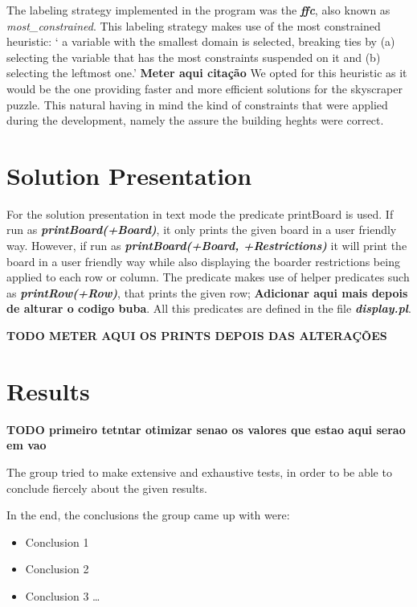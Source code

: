 \documentclass{llncs}
\begin{document}
The labeling strategy implemented in the program was the \textbf{\textit{ffc}}, also known as \textit{most\_constrained}. This labeling strategy makes use of the most constrained heuristic: ` a variable with the smallest domain is selected, breaking ties by (a) selecting the variable that has the most constraints suspended on it and (b) selecting the leftmost one.' \textbf{Meter aqui citação} We opted for this heuristic as it would be the one providing faster and more efficient solutions for the skyscraper puzzle. This natural having in mind the kind of constraints that were applied during the development, namely the assure the building heghts were correct.

%
\section{Solution Presentation}

For the solution presentation in text mode the predicate printBoard is used. If run as \textbf{\textit{printBoard(+Board)}}, it only prints the given board in a user friendly way. However, if run as \textbf{\textit{printBoard(+Board, +Restrictions)}} it will print the board in a user friendly way while also displaying the boarder restrictions being applied to each row or column. The predicate makes use of helper predicates such as \textbf{\textit{printRow(+Row)}}, that prints the given row; \textbf{Adicionar aqui mais depois de alturar o codigo buba}. All this predicates are defined in the file \textbf{\textit{display.pl}}.

\textbf{TODO METER AQUI OS PRINTS DEPOIS DAS ALTERAÇÕES}

%
\section{Results}

\textbf{TODO primeiro tetntar otimizar senao os valores que estao aqui serao em vao}

The group tried to make extensive and exhaustive tests, in order to be able to conclude fiercely about the given results.

In the end, the conclusions the group came up with were:
\begin{itemize}
	\item Conclusion 1
	\item Conclusion 2
	\item Conclusion 3 \dots
\end{itemize}
\end{document}
